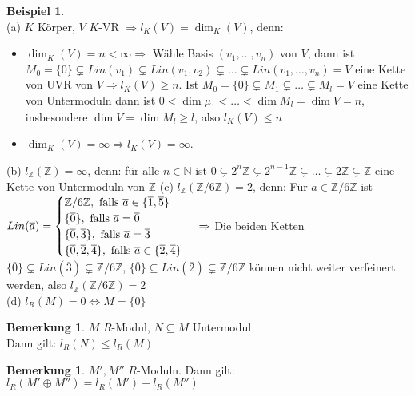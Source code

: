 \documentclass[10pt,a4paper,numbers=endperiod]{scrartcl}
\theoremstyle{definition}
\newtheorem{bem}[satz]{Bemerkung}
\newtheorem{bsp}[satz]{Beispiel}
\def\NN{{\mathbb N}}
\def\ZZ{{\mathbb Z}}
\begin{document}
\begin{bsp}
	$ $\\
	(a) $K$ Körper, $V$ $K$-VR $\Rightarrow l_K(V) = \dim_K(V)$, denn:
	\begin{itemize}
		\item $\dim_K(V) = n < \infty \Rightarrow$ Wähle Basis $(v_1, \ldots, v_n)$ von $V$, dann ist $M_0 = \{0\} \subsetneq Lin(v_1) \subsetneq Lin(v_1, v_2) \subsetneq \ldots \subsetneq Lin(v_1, \ldots, v_n) = V$ eine Kette von UVR von $V \Rightarrow l_K(V) \geq n$. Ist $M_0 = \{0\} \subsetneq M_1 \subsetneq \ldots \subsetneq M_l = V$ eine Kette von Untermoduln dann ist $0 < \dim \mu_1 < \ldots < \dim M_l = \dim V = n$, insbesondere $\dim V = \dim M_l \geq l$, also $l_K(V) \leq n$
		\item $\dim_K(V) = \infty \Rightarrow l_K(V) = \infty$.
	\end{itemize}
	(b) $l_{\ZZ}(\ZZ) = \infty$, denn: für alle $n \in \NN$ ist $0 \subsetneq 2^n\ZZ \subsetneq 2^{n-1} \ZZ \subsetneq \ldots \subsetneq 2 \ZZ \subsetneq \ZZ$ eine Kette von Untermoduln von $\ZZ$
	(c) $l_{\ZZ} (\ZZ/6\ZZ) = 2$, denn: Für $\overline{a} \in \ZZ/6\ZZ$ ist\\
	$Lin(\overline{a}) = \begin{cases}
	\ZZ/6\ZZ, \text{ falls } \overline{a} \in \{\overline{1}, \overline{5}\}\\
	\{\overline{0}\}, \text{ falls } \overline{a} = \overline{0}\\
	\{\overline{0}, \overline{3}\}, \text{ falls } \overline{a} = \overline{3}\\
	\{\overline{0}, \overline{2}, \overline{4}\}, \text{ falls } \overline{a} \in \{\overline{2}, \overline{4}\}
	\end{cases}\\
	\Rightarrow$ Die beiden Ketten $\{\overline{0}\} \subsetneq Lin(\overline{3}) \subsetneq \ZZ/6\ZZ$, $\{\overline{0}\} \subseteq Lin(\overline{2}) \subsetneq \ZZ/6\ZZ$ können nicht weiter verfeinert werden, also $l_\ZZ(\ZZ/6\ZZ) = 2$\\
	(d) $l_R(M) = 0 \Leftrightarrow M = \{0\}$
\end{bsp}

\begin{bem}
	$M$ $R$-Modul, $N \subseteq M$ Untermodul\\
	Dann gilt: $l_R(N) \leq l_R(M)$
\end{bem}

\begin{bem}
	$M', M''$ $R$-Moduln. Dann gilt:\\
	$l_R(M' \oplus M'')= l_R(M') + l_R(M'')$
\end{bem}
\end{document}
